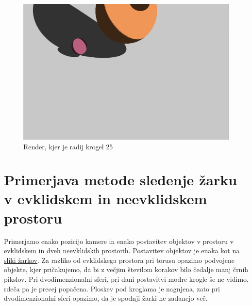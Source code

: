 \documentclass[titlepage]{article}
\begin{document}
\begin{figure} [H]
    \centering
    \includegraphics[width=0.6\linewidth]{Images/2sphere_24mm_R=25.png}
    \caption{Render, kjer je radij krogel 25}
    \label{fig:2sphere R=25}
\end{figure}

\section{Primerjava metode sledenje žarku v evklidskem in neevklidskem prostoru}
Primerjamo enako pozicijo kamere in enako postavitev objektov v prostoru v evklidskem in dveh neevklidskih prostorih. Postavitev objektov je enaka kot
na \hyperref[fig:2sphRays2]{sliki žarkov}. Za razliko od evklidskega prostora pri torusu opazimo podvojene objekte, kjer pričakujemo, da bi z večjim številom korakov bilo čedalje manj črnih pikslov. Pri dvodimenzionalni sferi, pri dani postavitvi modre krogle še ne vidimo, rdeča pa je precej popačena. Ploskev pod kroglama je nagnjena, zato pri dvodimenzionalni sferi opazimo, da je spodnji žarki ne zadanejo več.
\end{document}
